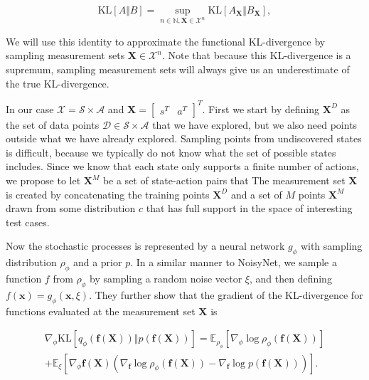 \documentclass[]{uai2022} %
\newcommand{\E}{\mathbb{E}}
\newcommand{\N}{\mathbb{N}}
\newcommand{\D}{\mathcal{D}}
\newcommand{\X}{\mathbf{X}}
\newcommand{\f}{\mathbf{f}}
\newcommand{\state}{\mathcal{S}}
\newcommand{\action}{\mathcal{A}}
\newcommand{\KL}{\mathrm{KL}}
\begin{document}
\begin{equation}
    \KL[A \Vert B] = \sup_{n \in \N, \X \in \mathcal{X}^n} \KL \left[ A_\X \Vert B_\X \right],
\end{equation}

We will use this identity to approximate the functional KL-divergence by sampling 
measurement sets \(\X \in \mathcal{X}^n\). Note that because this KL-divergence is a 
supremum, sampling measurement sets will always give us an underestimate of the true
KL-divergence. 

In our case \(\mathcal{X} = \state \times \action\) and \(\X = \begin{bmatrix} s^T & a^T \end{bmatrix}^T\). First we start by
defining \(\X^D\) as the set of data points \(\D \in \state \times \action\) that we have
explored, but we also need points outside what we have already explored. Sampling points
from undiscovered states is difficult, because we typically do not know what the set
of possible states includes. Since we know that each state only supports a finite number of
actions, we propose to let \(\X^M\) be a set of state-action pairs that 
The measurement set \(\X\) is created by concatenating the training points \(\X^D\) and a
set of \(M\) points \(\X^M\) drawn from some distribution \(c\) that has full support
in the space of interesting test cases. 

Now the stochastic processes is represented by a neural network \(g_\phi\) with sampling
distribution \(\rho_\phi\) and a prior \(p\). In a similar
manner to NoisyNet, we sample a function \(f\) from \(\rho_\phi\) by sampling a random noise vector
\(\xi\), and then defining \(f(\bm{x}) = g_\phi(\bm{x}, \xi)\). They further show that the
gradient of the KL-divergence for functions evaluated at the measurement set \(\X\) is

\begin{multline}\label{eq:fkl}
    \nabla_\phi \KL[q_\phi(\f(\X)) \Vert p(\f(\X))] = \E_{\rho_\phi} \left[ \nabla_\phi \log \rho_\phi (\f(\X)) \right]\\
    + \E_\xi \left[ \nabla_\phi \f(\X)( \nabla_\f \log \rho_\phi(\f(\X)) - \nabla_\f \log p(\f(\X))) \right].
\end{multline}
\end{document}
